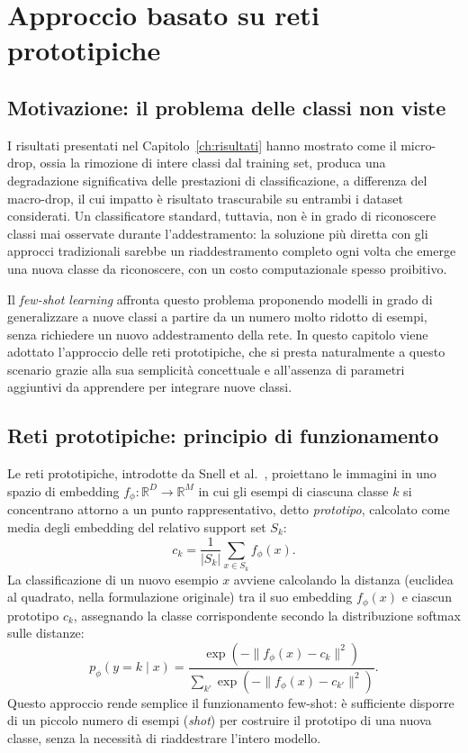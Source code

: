 \chapter{Approccio basato su reti prototipiche}

\section{Motivazione: il problema delle classi non viste}
I risultati presentati nel Capitolo~\ref{ch:risultati} hanno mostrato come il micro-drop, ossia la rimozione di intere classi dal training set, produca una degradazione significativa delle prestazioni di classificazione, 
a differenza del macro-drop, il cui impatto è risultato trascurabile su entrambi i dataset considerati. 
Un classificatore standard, tuttavia, non è in grado di riconoscere classi mai osservate durante l'addestramento: la soluzione più diretta con gli approcci tradizionali sarebbe un riaddestramento completo ogni volta che 
emerge una nuova classe da riconoscere, con un costo computazionale spesso proibitivo.

Il \emph{few-shot learning} affronta questo problema proponendo modelli in grado di generalizzare a nuove classi a partire da un numero molto ridotto di esempi, 
senza richiedere un nuovo addestramento della rete. In questo capitolo viene adottato l'approccio delle reti prototipiche, 
che si presta naturalmente a questo scenario grazie alla sua semplicità concettuale e all'assenza di parametri aggiuntivi da apprendere per integrare nuove classi.

\section{Reti prototipiche: principio di funzionamento}
Le reti prototipiche, introdotte da Snell et al.~\cite{snell2017prototypical}, proiettano le immagini in uno spazio di embedding $f_\phi: \mathbb{R}^D \rightarrow \mathbb{R}^M$ 
in cui gli esempi di ciascuna classe $k$ si concentrano attorno a un punto rappresentativo, detto \emph{prototipo}, 
calcolato come media degli embedding del relativo support set $S_k$:
\begin{equation}
    c_k = \frac{1}{|S_k|} \sum_{x \in S_k} f_\phi(x).
\end{equation}
La classificazione di un nuovo esempio $x$ avviene calcolando la distanza (euclidea al quadrato, nella formulazione originale) tra il suo embedding $f_\phi(x)$ e ciascun prototipo $c_k$, assegnando la classe corrispondente secondo la distribuzione softmax sulle distanze:
\begin{equation}
    p_\phi(y=k \mid x) = \frac{\exp(-\|f_\phi(x) - c_k\|^2)}{\sum_{k'} \exp(-\|f_\phi(x) - c_{k'}\|^2)}.
\end{equation}
Questo approccio rende semplice il funzionamento few-shot: è sufficiente disporre di un piccolo numero di esempi (\emph{shot}) per costruire il prototipo di una nuova classe, senza la necessità di riaddestrare l'intero modello.

